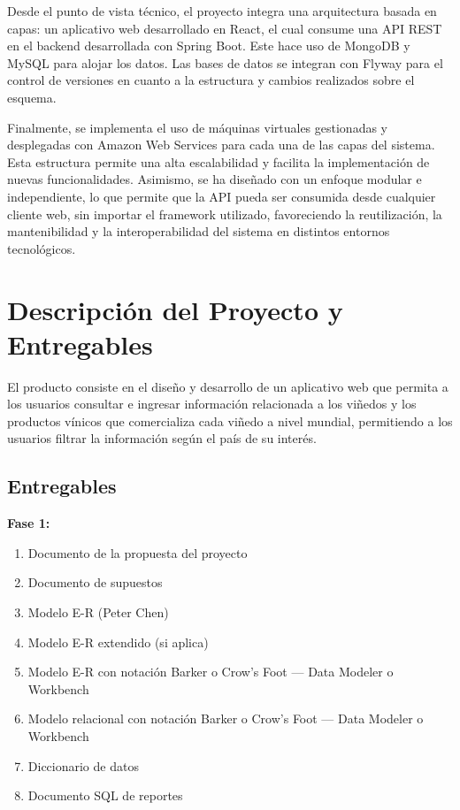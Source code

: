 \documentclass[12pt, a4paper]{article}
\begin{document}
Desde el punto de vista técnico, el proyecto integra una arquitectura basada en capas: un aplicativo web desarrollado en React, el cual consume una API REST en el backend desarrollada con Spring Boot. Este hace uso de MongoDB y MySQL para alojar los datos. Las bases de datos se integran con Flyway para el control de versiones en cuanto a la estructura y cambios realizados sobre el esquema.

Finalmente, se implementa el uso de máquinas virtuales gestionadas y desplegadas con Amazon Web Services para cada una de las capas del sistema. Esta estructura permite una alta escalabilidad y facilita la implementación de nuevas funcionalidades. Asimismo, se ha diseñado con un enfoque modular e independiente, lo que permite que la API pueda ser consumida desde cualquier cliente web, sin importar el framework utilizado, favoreciendo la reutilización, la mantenibilidad y la interoperabilidad del sistema en distintos entornos tecnológicos.

\section{Descripción del Proyecto y Entregables}

El producto consiste en el diseño y desarrollo de un aplicativo web que permita a los usuarios consultar e ingresar información relacionada a los viñedos y los productos vínicos que comercializa cada viñedo a nivel mundial, permitiendo a los usuarios filtrar la información según el país de su interés.

\subsection*{Entregables}

\textbf{Fase 1:}
\begin{enumerate}[leftmargin=2cm]
    \item Documento de la propuesta del proyecto
    \item Documento de supuestos
    \item Modelo E-R (Peter Chen)
    \item Modelo E-R extendido (si aplica)
    \item Modelo E-R con notación Barker o Crow's Foot — Data Modeler o Workbench
    \item Modelo relacional con notación Barker o Crow's Foot — Data Modeler o Workbench
    \item Diccionario de datos
    \item Documento SQL de reportes
\end{enumerate}
\end{document}
